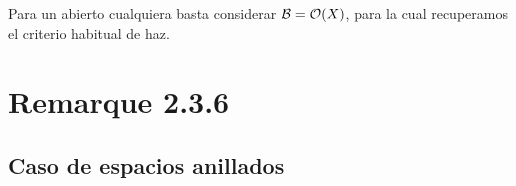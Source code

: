 \documentclass[twoside]{article}
\begin{document}
\begin{dem}
Para un abierto cualquiera basta considerar ${\mathcal B}={\mathcal O}(X)$, para la cual recuperamos el criterio habitual de haz.

 \end{dem}
 
 




\section{Remarque 2.3.6}


 \subsection{Caso de espacios anillados}
\end{document}
